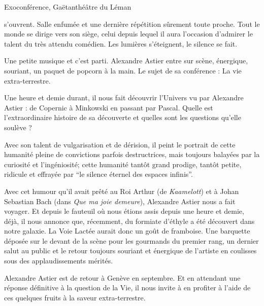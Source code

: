 \vspace*{-5mm}
\begin{article}
{Exoconférence,}
{Gaëtan}{théâtre du Léman}

\vspace*{-2mm}
\begin{spacing}{1.05}
 s’ouvrent. Salle enfumée et une dernière répétition sûrement toute proche. Tout le monde se dirige vers son siège, celui depuis lequel il aura l’occasion  d’admirer le talent du très attendu comédien. Les lumières s’éteignent, le silence se fait.

Une petite musique et c’est parti. Alexandre Astier entre sur scène, énergique, souriant, un paquet de popcorn à la main.  Le sujet de sa conférence : La vie extra-terrestre.

Une heure et demie durant, il nous fait découvrir l’Univers vu par Alexandre Astier : de Copernic à Minkowski en passant par Pascal. Quelle est l’extraordinaire histoire de sa découverte et quelles sont les questions qu’elle soulève ?


Avec son talent de vulgarisation et de dérision, il peint le portrait de cette humanité pleine de convictions parfois destructrices, mais toujours balayées par la curiosité et l’ingéniosité; cette humanité tantôt grand prodige, tantôt petite, ridicule et effrayée par \enquote{le silence éternel des espaces infinis}.

Avec cet humour qu’il avait prêté au Roi Arthur (de \textit{Kaamelott}) et à Johan Sebastian Bach (dans \textit{Que ma joie demeure}), Alexandre Astier nous a fait voyager. Et depuis le fauteuil où nous étions assis depuis une heure et demie, déjà, il nous annonce que, récemment, du formiate d’éthyle a été découvert dans notre galaxie. La Voie Lactée aurait donc un goût de framboise. Une barquette déposée sur le devant de la scène pour les gourmands du premier rang, un dernier salut au public et le retour toujours souriant et énergique de l’artiste en coulisses sous des applaudissements mérités.

Alexandre Astier est de retour à Genève en septembre. Et en attendant une réponse définitive à la question de la Vie, il nous invite à en profiter à l’aide de ces quelques fruits à la saveur extra-terrestre.\end{spacing}
\end{article}


